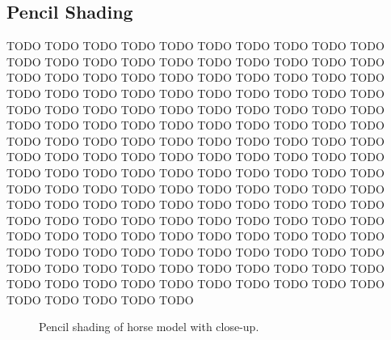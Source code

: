   \subsection{Pencil Shading}

      TODO TODO TODO TODO TODO TODO TODO TODO TODO TODO TODO TODO TODO TODO TODO
      TODO TODO TODO TODO TODO TODO TODO TODO TODO TODO TODO TODO TODO TODO TODO
      TODO TODO TODO TODO TODO TODO TODO TODO TODO TODO TODO TODO TODO TODO TODO
      TODO TODO TODO TODO TODO TODO TODO TODO TODO TODO TODO TODO TODO TODO TODO
      TODO TODO TODO TODO TODO TODO TODO TODO TODO TODO TODO TODO TODO TODO TODO
      TODO TODO TODO TODO TODO TODO TODO TODO TODO TODO TODO TODO TODO TODO TODO
      TODO TODO TODO TODO TODO TODO TODO TODO TODO TODO TODO TODO TODO TODO TODO
      TODO TODO TODO TODO TODO TODO TODO TODO TODO TODO TODO TODO TODO TODO TODO
      TODO TODO TODO TODO TODO TODO TODO TODO TODO TODO TODO TODO TODO TODO TODO
      TODO TODO TODO TODO TODO TODO TODO TODO TODO TODO TODO TODO TODO TODO TODO
      TODO TODO TODO TODO TODO TODO TODO TODO TODO TODO TODO TODO TODO TODO TODO

    \begin{figure}
      \centering



      \caption{Pencil shading of horse model with close-up.}
      \label{pencil1}
    \end{figure}

